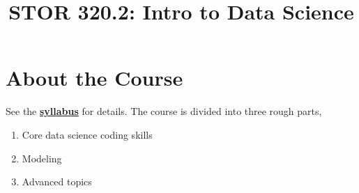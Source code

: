 \documentclass[
]{article}
\title{\textbf{STOR 320.2: Intro to Data Science}}
\author{}
\date{\vspace{-2.5em}}
\providecommand{\tightlist}{%
  \setlength{\itemsep}{0pt}\setlength{\parskip}{0pt}}
\begin{document}
\maketitle

{
\setcounter{tocdepth}{2}
\tableofcontents
}
\hypertarget{about-the-course}{%
\section{\texorpdfstring{\textbf{About the
Course}}{About the Course}}\label{about-the-course}}

See the \textbf{\href{Syllabi/320_Syllabus.pdf}{syllabus}} for details.
The course is divided into three rough parts,

\begin{enumerate}
\def\labelenumi{\arabic{enumi}.}
\tightlist
\item
  Core data science coding skills
\item
  Modeling
\item
  Advanced topics
\end{enumerate}
\end{document}
